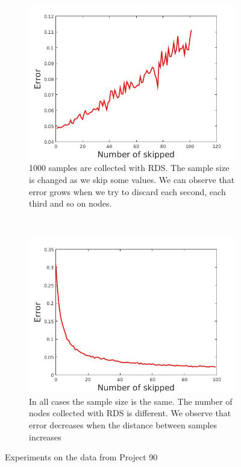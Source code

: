 \documentclass[12pt]{report}
\begin{document}
\begin{figure}[h]
    \centering
    \begin{subfigure}[b]{0.45\textwidth}
        \includegraphics[width=\textwidth]{observation2}
        \caption{1000 samples are collected with RDS. The sample size is changed as we skip some values. We can observe that error grows when we try to discard each second, each third and so on nodes.}

    \end{subfigure}
	~ 
    \begin{subfigure}[b]{0.45\textwidth}
        \includegraphics[width=\textwidth]{observation3}
        \caption{In all cases the sample size is the same. The number of nodes collected with RDS is different. We observe that error decreases when the distance between samples increases}

    \end{subfigure}
    
    \caption{Experiments on the data from Project 90}
    \label{fig:observations}
\end{figure}
\end{document}
